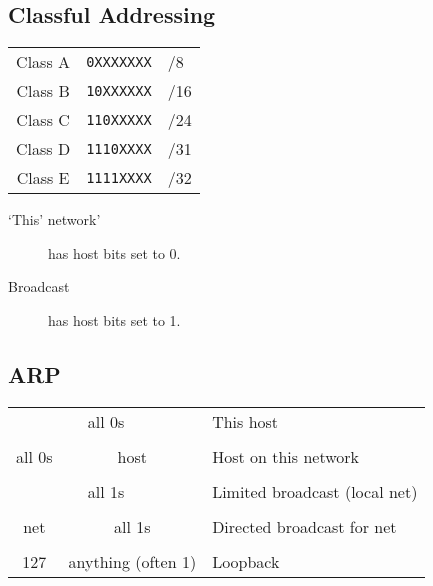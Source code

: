 \documentclass[8pt]{extarticle}
\begin{document}
\begin{multicols}{2}
  \subsection*{Classful Addressing}
  \begin{tabular}{c|c|l}
    Class A & \texttt{0XXXXXXX} & /8  \\
    Class B & \texttt{10XXXXXX} & /16 \\
    Class C & \texttt{110XXXXX} & /24 \\
    Class D & \texttt{1110XXXX} & /31 \\
    Class E & \texttt{1111XXXX} & /32 \\
  \end{tabular}

  \begin{description}
    \item[`This' network'] has host bits set to 0.
    \item[Broadcast] has host bits set to 1.
  \end{description}

  \subsection*{ARP}

  \columnbreak

  \begin{tabular}{|c|c|c|c|l}
    \cline{0-3}
    \multicolumn{4}{|c|}{all 0s} & This host                                               \\
    \cline{0-3}
    \multicolumn{5}{c}{}                                                                   \\
    \cline{0-3}
    \multicolumn{2}{|c|}{all 0s} & \multicolumn{2}{|c|}{host}               & Host on this
    network                                                                                \\
    \cline{0-3}
    \multicolumn{5}{c}{}                                                                   \\
    \cline{0-3}
    \multicolumn{4}{|c|}{all 1s} & Limited broadcast (local net)                           \\
    \cline{0-3}
    \multicolumn{5}{c}{}                                                                   \\
    \cline{0-3}
    \multicolumn{2}{|c|}{net}    & \multicolumn{2}{|c|}{all 1s}             & Directed
    broadcast for net                                                                      \\
    \cline{0-3}
    \multicolumn{5}{c}{}                                                                   \\
    \cline{0-3}
    127                          & \multicolumn{3}{|c|}{anything (often 1)} &
    Loopback                                                                               \\
    \cline{0-3}
  \end{tabular}
\end{multicols}
\end{document}
